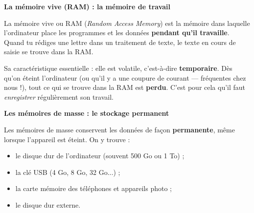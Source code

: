 \documentclass[11pt]{article}
\newcommand{\cle}[1]{{\popxbold\color{popdark}#1}}
\begin{document}
\textbf{La mémoire vive (RAM) : la mémoire de travail}\par

La \cle{mémoire vive} ou \cle{RAM} (\emph{Random Access Memory}) est la mémoire dans laquelle l'ordinateur place les programmes et les données \textbf{pendant qu'il travaille}. Quand tu rédiges une lettre dans un traitement de texte, le texte en cours de saisie se trouve dans la RAM.

Sa caractéristique essentielle : elle est \cle{volatile}, c'est-à-dire \textbf{temporaire}. Dès qu'on éteint l'ordinateur (ou qu'il y a une coupure de courant — fréquentes chez nous !), tout ce qui se trouve dans la RAM est \textbf{perdu}. C'est pour cela qu'il faut \emph{enregistrer} régulièrement son travail.

\textbf{Les mémoires de masse : le stockage permanent}\par

Les \cle{mémoires de masse} conservent les données de façon \textbf{permanente}, même lorsque l'appareil est éteint. On y trouve :
\begin{itemize}
\item le \cle{disque dur} de l'ordinateur (souvent 500 Go ou 1 To) ;
\item la \cle{clé USB} (4 Go, 8 Go, 32 Go...) ;
\item la \cle{carte mémoire} des téléphones et appareils photo ;
\item le disque dur externe.
\end{itemize}
\end{document}
